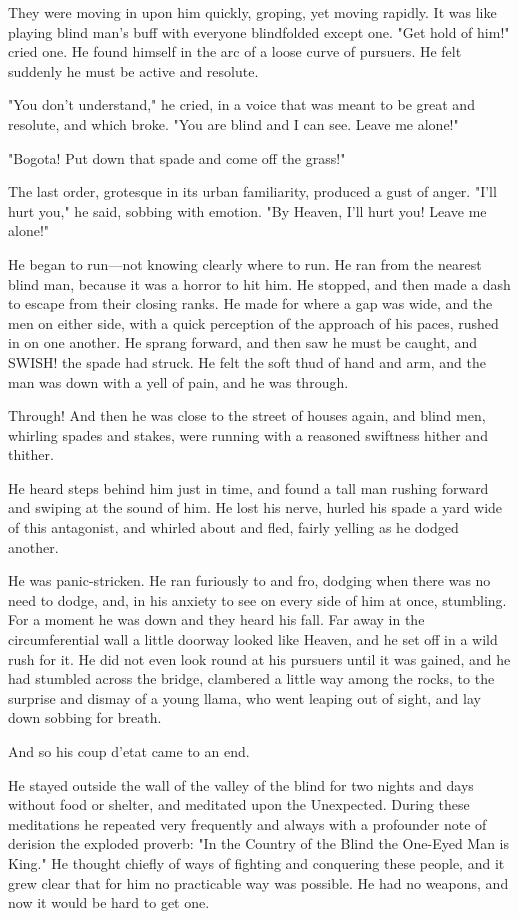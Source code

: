\documentclass[courier]{sffms}
\begin{document}
They were moving in upon him quickly, groping, yet moving rapidly. It
was like playing blind man's buff with everyone blindfolded except
one. "Get hold of him!" cried one. He found himself in the arc of a
loose curve of pursuers. He felt suddenly he must be active and
resolute.

"You don't understand," he cried, in a voice that was meant to be
great and resolute, and which broke. "You are blind and I can
see. Leave me alone!"

"Bogota! Put down that spade and come off the grass!"

The last order, grotesque in its urban familiarity, produced a gust of
anger.  "I'll hurt you," he said, sobbing with emotion. "By Heaven,
I'll hurt you! Leave me alone!"

He began to run---not knowing clearly where to run. He ran from the
nearest blind man, because it was a horror to hit him. He stopped, and
then made a dash to escape from their closing ranks. He made for where
a gap was wide, and the men on either side, with a quick perception of
the approach of his paces, rushed in on one another. He sprang
forward, and then saw he must be caught, and SWISH!  the spade had
struck. He felt the soft thud of hand and arm, and the man was down
with a yell of pain, and he was through.

Through! And then he was close to the street of houses again, and
blind men, whirling spades and stakes, were running with a reasoned
swiftness hither and thither.

He heard steps behind him just in time, and found a tall man rushing
forward and swiping at the sound of him. He lost his nerve, hurled his
spade a yard wide of this antagonist, and whirled about and fled,
fairly yelling as he dodged another.

He was panic-stricken. He ran furiously to and fro, dodging when there
was no need to dodge, and, in his anxiety to see on every side of him
at once, stumbling. For a moment he was down and they heard his
fall. Far away in the circumferential wall a little doorway looked
like Heaven, and he set off in a wild rush for it. He did not even
look round at his pursuers until it was gained, and he had stumbled
across the bridge, clambered a little way among the rocks, to the
surprise and dismay of a young llama, who went leaping out of sight,
and lay down sobbing for breath.

And so his coup d'etat came to an end.

He stayed outside the wall of the valley of the blind for two nights
and days without food or shelter, and meditated upon the
Unexpected. During these meditations he repeated very frequently and
always with a profounder note of derision the exploded proverb: "In
the Country of the Blind the One-Eyed Man is King." He thought chiefly
of ways of fighting and conquering these people, and it grew clear
that for him no practicable way was possible. He had no weapons, and
now it would be hard to get one.
\end{document}
